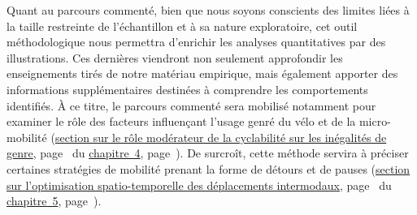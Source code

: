 \begin{refsegment}
Quant au parcours commenté, bien que nous soyons conscients des limites liées à la taille restreinte de l’échantillon et à sa nature exploratoire, cet outil méthodologique nous permettra d’enrichir les analyses quantitatives par des illustrations. Ces dernières viendront non seulement approfondir les enseignements tirés de notre matériau empirique, mais également apporter des informations supplémentaires destinées à comprendre les comportements identifiés. À ce titre, le parcours commenté sera mobilisé notamment pour examiner le rôle des facteurs influençant l’usage genré du vélo et de la micro-mobilité (\hyperref[section-chap4:cyclabilite-genre]{section sur le rôle modérateur de la cyclabilité sur les inégalités de genre}, page~\pageref{section-chap4:cyclabilite-genre} du \hyperref[chap4:titre]{chapitre~4}, page~\pageref{chap4:titre}). De surcroît, cette méthode  servira à préciser certaines stratégies de mobilité prenant la forme de détours et de pauses (\hyperref[chap5:detours-pauses-optimisation]{section sur l’optimisation spatio-temporelle des déplacements intermodaux}, page~\pageref{chap5:detours-pauses-optimisation} du \hyperref[chap5:titre]{chapitre~5}, page~\pageref{chap5:titre}).%

     \newpage
     

\end{refsegment}
